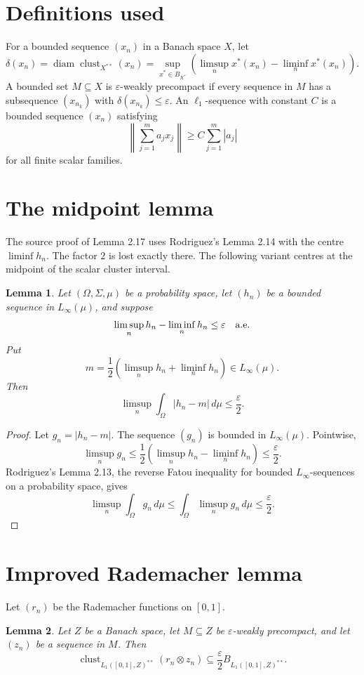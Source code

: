 \documentclass[11pt]{article}
\newcommand{\eps}{\varepsilon}
\newcommand{\sub}{\subseteq}
\newcommand{\clust}{\operatorname{clust}}
\newcommand{\diam}{\operatorname{diam}}
\newtheorem{lemma}{Lemma}
\begin{document}
\section*{Definitions used}

For a bounded sequence $(x_n)$ in a Banach space $X$, let
\[
\delta(x_n)=\diam\clust_{X^{**}}(x_n)
 = \sup_{x^*\in B_{X^*}}
 \left(\limsup_n x^*(x_n)-\liminf_n x^*(x_n)\right).
\]
A bounded set $M\sub X$ is $\eps$-weakly precompact if every sequence in $M$
has a subsequence $(x_{n_k})$ with $\delta(x_{n_k})\leq\eps$.
An $\ell_1$-sequence with constant $C$ is a bounded sequence $(x_n)$ satisfying
\[
\left\|\sum_{j=1}^m a_j x_j\right\|\geq C\sum_{j=1}^m |a_j|
\]
for all finite scalar families.

\section*{The midpoint lemma}

The source proof of Lemma 2.17 uses Rodriguez's Lemma 2.14 with the centre
$\liminf h_n$. The factor $2$ is lost exactly there. The following variant
centres at the midpoint of the scalar cluster interval.

\begin{lemma}\label{lem:midpoint}
Let $(\Omega,\Sigma,\mu)$ be a probability space, let $(h_n)$ be a bounded
sequence in $L_\infty(\mu)$, and suppose
\[
\limsup_n h_n-\liminf_n h_n\leq \eps\quad\hbox{a.e.}
\]
Put
\[
m=\frac12\left(\limsup_n h_n+\liminf_n h_n\right)\in L_\infty(\mu).
\]
Then
\[
\limsup_n\int_\Omega |h_n-m|\,d\mu\leq \frac{\eps}{2}.
\]
\end{lemma}

\begin{proof}
Let $g_n=|h_n-m|$. The sequence $(g_n)$ is bounded in $L_\infty(\mu)$. Pointwise,
\[
\limsup_n g_n
\leq
\frac12\left(\limsup_n h_n-\liminf_n h_n\right)
\leq \frac{\eps}{2}.
\]
Rodriguez's Lemma 2.13, the reverse Fatou inequality for bounded
$L_\infty$-sequences on a probability space, gives
\[
\limsup_n\int_\Omega g_n\,d\mu
\leq \int_\Omega\limsup_n g_n\,d\mu
\leq \frac{\eps}{2}.
\]
\end{proof}

\section*{Improved Rademacher lemma}

Let $(r_n)$ be the Rademacher functions on $[0,1]$.

\begin{lemma}\label{lem:improved-bh}
Let $Z$ be a Banach space, let $M\sub Z$ be $\eps$-weakly precompact, and let
$(z_n)$ be a sequence in $M$. Then
\[
\clust_{L_1([0,1],Z)^{**}}(r_n\otimes z_n)
\sub \frac{\eps}{2}B_{L_1([0,1],Z)^{**}}.
\]
\end{lemma}
\end{document}
